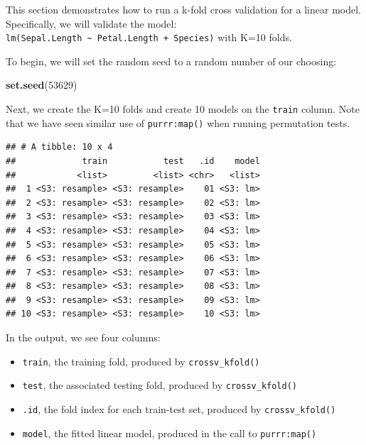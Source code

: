 \documentclass[]{article}
\newenvironment{Shaded}{\begin{snugshade}}{\end{snugshade}}
\newcommand{\KeywordTok}[1]{\textcolor[rgb]{0.13,0.29,0.53}{\textbf{#1}}}
\newcommand{\DataTypeTok}[1]{\textcolor[rgb]{0.13,0.29,0.53}{#1}}
\newcommand{\DecValTok}[1]{\textcolor[rgb]{0.00,0.00,0.81}{#1}}
\newcommand{\StringTok}[1]{\textcolor[rgb]{0.31,0.60,0.02}{#1}}
\newcommand{\OperatorTok}[1]{\textcolor[rgb]{0.81,0.36,0.00}{\textbf{#1}}}
\newcommand{\NormalTok}[1]{#1}
\providecommand{\tightlist}{%
  \setlength{\itemsep}{0pt}\setlength{\parskip}{0pt}}
\begin{document}
This section demonstrates how to run a k-fold cross validation for a
linear model. Specifically, we will validate the model:
\texttt{lm(Sepal.Length\ \textasciitilde{}\ Petal.Length\ +\ Species)}
with K=10 folds.

To begin, we will set the random seed to a random number of our
choosing:

\begin{Shaded}
\begin{Highlighting}[]
\KeywordTok{set.seed}\NormalTok{(}\DecValTok{53629}\NormalTok{)}
\end{Highlighting}
\end{Shaded}

Next, we create the K=10 folds and create 10 models on the
\texttt{train} column. Note that we have seen similar use of
\texttt{purrr:map()} when running permutation tests.

\begin{Shaded}
\end{Shaded}

\begin{verbatim}
## # A tibble: 10 x 4
##             train           test   .id    model
##            <list>         <list> <chr>   <list>
##  1 <S3: resample> <S3: resample>    01 <S3: lm>
##  2 <S3: resample> <S3: resample>    02 <S3: lm>
##  3 <S3: resample> <S3: resample>    03 <S3: lm>
##  4 <S3: resample> <S3: resample>    04 <S3: lm>
##  5 <S3: resample> <S3: resample>    05 <S3: lm>
##  6 <S3: resample> <S3: resample>    06 <S3: lm>
##  7 <S3: resample> <S3: resample>    07 <S3: lm>
##  8 <S3: resample> <S3: resample>    08 <S3: lm>
##  9 <S3: resample> <S3: resample>    09 <S3: lm>
## 10 <S3: resample> <S3: resample>    10 <S3: lm>
\end{verbatim}

In the output, we see four columns:

\begin{itemize}
\tightlist
\item
  \texttt{train}, the training fold, produced by
  \texttt{crossv\_kfold()}
\item
  \texttt{test}, the associated testing fold, produced by
  \texttt{crossv\_kfold()}
\item
  \texttt{.id}, the fold index for each train-test set, produced by
  \texttt{crossv\_kfold()}
\item
  \texttt{model}, the fitted linear model, produced in the call to
  \texttt{purrr:map()}
\end{itemize}
\end{document}
